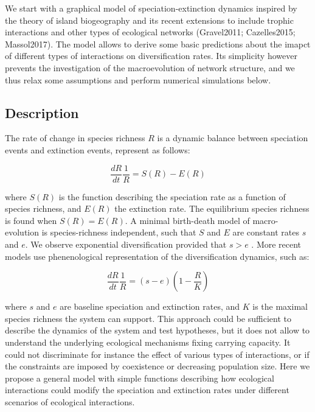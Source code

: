 \documentclass[12pt]{article}
\begin{document}
We start with a graphical model of speciation-extinction dynamics inspired by
the theory of island biogeography and its recent extensions to include trophic
interactions and other types of ecological networks (Gravel2011; Cazelles2015;
Massol2017). The model allows to derive some basic predictions about the
imapct of different types of interactions on diversification rates. Its
simplicity however prevents the investigation of the macroevolution of network
structure, and we thus relax some assumptions and perform numerical
simulations below.

\subsection*{Description} 

The rate of change in species richness $R$ is a dynamic balance between
speciation events and extinction events, represent as follows:

\begin{equation}
	\frac{dR}{dt}\frac{1}{R} = S(R) - E(R)
\end{equation}

where $S(R)$ is the function describing the speciation rate as a function of
species richness, and $E(R)$ the extinction rate. The equilibrium species
richness is found when $S(R) = E(R)$. A minimal birth-death model of macro-
evolution is species-richness independent, such that $S$ and $E$ are constant
rates $s$ and $e$. We observe exponential diversification provided that $s>e$
. More recent models use phenenological representation of the diversification
dynamics, such as:

\begin{equation}
	\frac{dR}{dt}\frac{1}{R} = (s-e)(1 - \frac{R}{K})
\end{equation}

where $s$ and $e$ are baseline speciation and extinction rates, and $K$ is the
maximal species richness the system can support. This approach could be
sufficient to describe the dynamics of the system and test hypotheses, but it
does not allow to understand the underlying ecological mechanisms fixing
carrying capacity. It could not discriminate for instance the effect of
various types of interactions, or if the constraints are imposed by
coexistence or decreasing population size. Here we propose a general model
with simple functions describing how ecological interactions could modify the
speciation and extinction rates under different scenarios of ecological
interactions.
\end{document}
